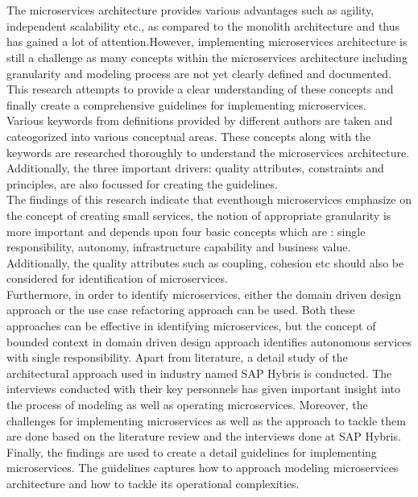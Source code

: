 \chapter{\abstractname}
The microservices architecture provides various advantages such as agility, independent scalability etc., as compared to the monolith architecture and thus has gained a lot of attention.However, implementing microservices architecture is still a challenge as many concepts within the microservices architecture including granularity and modeling process are not yet clearly defined and documented. This research attempts to provide a clear understanding of these concepts and finally create a comprehensive guidelines for implementing microservices.\\
Various keywords from definitions provided by different authors are taken and cateogorized into various conceptual areas. These concepts along with the keywords are researched thoroughly to understand the microservices architecture. Additionally, the three important drivers: quality attributes, constraints and principles, are also focussed for creating the guidelines.\\
The findings of this research indicate that eventhough microservices emphasize on the concept of creating small services, the notion of appropriate granularity is more important and depends upon four basic concepts which are : single responsibility, autonomy, infrastructure capability and business value. Additionally, the quality attributes such as coupling, cohesion etc should also be considered for identification of microservices.\\
Furthermore, in order to identify microservices, either the domain driven design approach or the use case refactoring approach can be used. Both these approaches can be effective in identifying microservices, but the concept of bounded context in domain driven design approach identifies autonomous services with single responsibility. Apart from literature, a detail study of the architectural approach used in industry named SAP Hybris is conducted. The interviews conducted with their key personnels has given important insight into the process of modeling as well as operating microservices. Moreover, the challenges for implementing microservices as well as the approach to tackle them are done based on the literature review and the interviews done at SAP Hybris.\\
Finally, the findings are used to create a detail guidelines for implementing microservices. The guidelines captures how to approach modeling microservices architecture and how to tackle its operational complexities.
